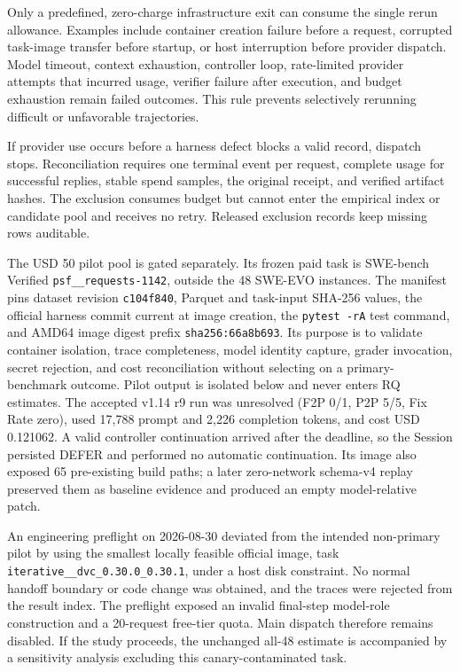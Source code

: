 Only a predefined, zero-charge infrastructure exit can consume the single rerun allowance. Examples include container creation failure before a request, corrupted task-image transfer before startup, or host interruption before provider dispatch. Model timeout, context exhaustion, controller loop, rate-limited provider attempts that incurred usage, verifier failure after execution, and budget exhaustion remain failed outcomes. This rule prevents selectively rerunning difficult or unfavorable trajectories.

If provider use occurs before a harness defect blocks a valid record, dispatch stops. Reconciliation requires one terminal event per request, complete usage for successful replies, stable spend samples, the original receipt, and verified artifact hashes. The exclusion consumes budget but cannot enter the empirical index or candidate pool and receives no retry. Released exclusion records keep missing rows auditable.

The USD 50 pilot pool is gated separately. Its frozen paid task is SWE-bench Verified \texttt{psf\_\_requests-1142}, outside the 48 SWE-EVO instances. The manifest pins dataset revision \texttt{c104f840}, Parquet and task-input SHA-256 values, the official harness commit current at image creation, the \texttt{pytest -rA} test command, and AMD64 image digest prefix \texttt{sha256:66a8b693}. Its purpose is to validate container isolation, trace completeness, model identity capture, grader invocation, secret rejection, and cost reconciliation without selecting on a primary-benchmark outcome. Pilot output is isolated below  and never enters RQ estimates. The accepted v1.14 r9 run was unresolved (F2P 0/1, P2P 5/5, Fix Rate zero), used 17,788 prompt and 2,226 completion tokens, and cost USD 0.121062. A valid controller continuation arrived after the deadline, so the Session persisted DEFER and performed no automatic continuation. Its image also exposed 65 pre-existing build paths; a later zero-network schema-v4 replay preserved them as baseline evidence and produced an empty model-relative patch.

An engineering preflight on 2026-08-30 deviated from the intended non-primary pilot by using the smallest locally feasible official image, task \texttt{iterative\_\_dvc\_0.30.0\_0.30.1}, under a host disk constraint. No normal handoff boundary or code change was obtained, and the traces were rejected from the result index. The preflight exposed an invalid final-step model-role construction and a 20-request free-tier quota. Main dispatch therefore remains disabled. If the study proceeds, the unchanged all-48 estimate is accompanied by a sensitivity analysis excluding this canary-contaminated task.

